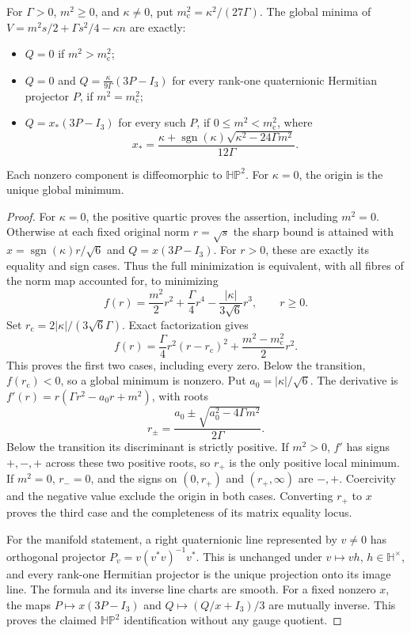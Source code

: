 \begin{theorem}\label{q444:vacua}
For $\Gamma>0$, $m^2\geq0$, and $\kappa\ne0$, put
$m_{\mathrm c}^2=\kappa^2/(27\Gamma)$.
The global minima of $V=m^2s/2+\Gamma s^2/4-\kappa n$ are exactly:
\begin{itemize}
\item $Q=0$ if $m^2>m_{\mathrm c}^2$;
\item $Q=0$ and $Q=\frac{\kappa}{9\Gamma}(3P-I_3)$ for every
rank-one quaternionic Hermitian projector $P$, if $m^2=m_{\mathrm c}^2$;
\item $Q=x_*(3P-I_3)$ for every such $P$, if $0\leq m^2<m_{\mathrm c}^2$,
where
\[
 x_* =\frac{\kappa+\operatorname{sgn}(\kappa)
              \sqrt{\kappa^2-24\Gamma m^2}}{12\Gamma}.
\]
\end{itemize}
Each nonzero component is diffeomorphic to $\mathbb{HP}^2$.
For $\kappa=0$, the origin is the unique global minimum.
\end{theorem}
\begin{proof}
For $\kappa=0$, the positive quartic proves the assertion, including
$m^2=0$. Otherwise at each fixed original norm $r=\sqrt s$ the sharp
bound is attained with
$x=\operatorname{sgn}(\kappa)r/\sqrt6$ and $Q=x(3P-I_3)$.
For $r>0$, these are exactly its equality and sign cases. Thus the full
minimization is equivalent, with all fibres of the norm map accounted for,
to minimizing
\[
 f(r)=\frac{m^2}{2}r^2+\frac\Gamma4r^4
                   -\frac{|\kappa|}{3\sqrt6}r^3,\qquad r\geq0.
\]
Set $r_{\mathrm c}=2|\kappa|/(3\sqrt6\Gamma)$. Exact factorization gives
\[
 f(r)=\frac\Gamma4r^2(r-r_{\mathrm c})^2
                    +\frac{m^2-m_{\mathrm c}^2}{2}r^2.
\]
This proves the first two cases, including every zero. Below the transition,
$f(r_{\mathrm c})<0$, so a global minimum is nonzero. Put
$a_0=|\kappa|/\sqrt6$. The derivative is
$f'(r)=r(\Gamma r^2-a_0r+m^2)$, with roots
\[
 r_\pm=\frac{a_0\pm\sqrt{a_0^2-4\Gamma m^2}}{2\Gamma}.
\]
Below the transition its discriminant is strictly positive. If $m^2>0$,
$f'$ has signs $+,-,+$ across these two positive roots, so $r_+$ is the
only positive local minimum. If $m^2=0$, $r_-=0$, and the signs on
$(0,r_+)$ and $(r_+,\infty)$ are $-,+$. Coercivity and the negative
value exclude the origin in both cases. Converting $r_+$ to $x$ proves
the third case and the completeness of its matrix equality locus.

For the manifold statement, a right quaternionic line represented by
$v\ne0$ has orthogonal projector $P_v=v(v^*v)^{-1}v^*$.
This is unchanged under $v\mapsto vh$, $h\in\mathbb H^\times$,
and every rank-one Hermitian projector is the unique projection onto
its image line. The formula and its inverse line charts are smooth.
For a fixed nonzero $x$, the maps $P\mapsto x(3P-I_3)$ and
$Q\mapsto(Q/x+I_3)/3$ are mutually inverse. This proves the claimed
$\mathbb{HP}^2$ identification without any gauge quotient.
\end{proof}

